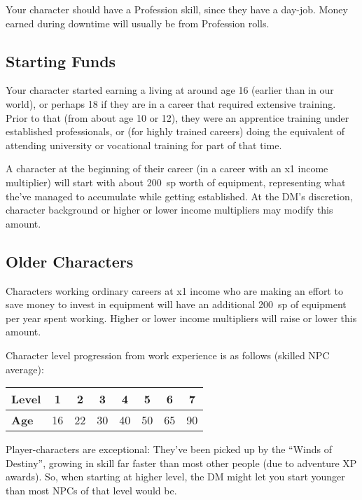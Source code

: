 Your character should have a Profession skill, since they have a day-job.
Money earned during downtime will usually be from Profession rolls.

%
\subsection{Starting Funds}

Your character started earning a living at around age 16 (earlier than in
our world), or perhaps 18 if they are in a career that required extensive
training. Prior to that (from about age 10 or 12), they were an apprentice
training under established professionals, or (for highly trained careers)
doing the equivalent of attending university or vocational training for
part of that time.

A character at the beginning of their career (in a career with an x1 income
multiplier) will start with about 200~sp worth of equipment, representing
what the've managed to accumulate while getting established. At the DM's
discretion, character background or higher or lower income multipliers may
modify this amount.


%
\subsection{Older Characters}

Characters working ordinary careers at x1 income who are making an effort
to save money to invest in equipment will have an additional 200~sp of
equipment per year spent working. Higher or lower income multipliers will
raise or lower this amount.


Character level progression from work experience is as follows (skilled NPC
average):

\begin{tabular}{|l||c|c|c|c|c|c|c|}\hline
\textbf{Level} & 1 & 2 & 3 & 4 & 5 & 6 & 7 \\ \hline
\textbf{Age} & 16 & 22 & 30 & 40 & 50 & 65 & 90 \\ \hline
\end{tabular}

Player-characters are exceptional: They've been picked up by the ``Winds
of Destiny'', growing in skill far faster than most other people (due to
adventure XP awards). So, when starting at higher level, the DM might let
you start younger than most NPCs of that level would be.

%
